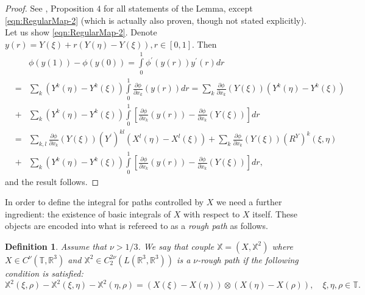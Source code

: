 \documentclass[11pt,a4paper,reqno]{amsart}%
\theoremstyle{plain}
\theoremstyle{remark}
\theoremstyle{plain}
\newtheorem{definition}[theorem]{Definition}
\numberwithin{equation}{section}
\def\Rnu{{\mathbb R}}
\def\suml{\sum\limits}
\def\intl{\int\limits}
\begin{document}
\begin{proof}%
See \cite{[Gubinelli-2004]}, Proposition $4$ for all statements of
the Lemma, except \eqref{eqn:RegularMap-2} (which is actually also
proven, though not stated explicitly). Let us show
\eqref{eqn:RegularMap-2}. Denote
$y(r)=Y(\xi)+r(Y(\eta)-Y(\xi)),r\in[0,1]$. Then
\begin{eqnarray}
\label{eqn:RegularMap-2proof}
&&
\phi(y(1))-\phi(y(0))=\intl_0^1\phi^\prime(y(r))y^\prime(r)dr
\\
\nonumber
&=&\suml_k(Y^k(\eta)-Y^k(\xi))\intl_0^1\frac{\partial\phi}{\partial
x_k}(y(r))dr
=\suml_k\frac{\partial\phi}{\partial
x_k}(Y(\xi))(Y^k(\eta)-Y^k(\xi))\nonumber
\\
&+&\suml_k(Y^k(\eta)-Y^k(\xi))\intl_0^1[\frac{\partial\phi}{\partial
x_k}(y(r))-\frac{\partial\phi}{\partial x_k}(Y(\xi))]dr\nonumber
\\
&=&\suml_{k,l}\frac{\partial\phi}{\partial
x_k}(Y(\xi))(Y^\prime)^{kl}(X^l(\eta)-X^l(\xi))
+\suml_{k}\frac{\partial\phi}{\partial
x_k}(Y(\xi))(R^Y)^k(\xi,\eta)\nonumber
\\
&+&\suml_k(Y^k(\eta)-Y^k(\xi))\intl_0^1[\frac{\partial\phi}{\partial
x_k}(y(r))-\frac{\partial\phi}{\partial
x_k}(Y(\xi))]dr,
\nonumber
\end{eqnarray}
and the result follows.
\end{proof}
In order to define the integral for paths controlled by $X$  we need a further ingredient: the existence of basic integrals of $X$ with respect to $X$ itself. These objects are encoded into what is refereed to as a \emph{rough path} as follows.
\begin{definition}\label{def:RoughPath}
Assume that  $\nu>{1}/{3}$. We say that couple
$\mathbb{X}=(X,\mathbb{X}^2)$ where $X\in C^{\nu}(\mathbb{T},\Rnu^3)$ and
$\mathbb{X}^2\in C_2^{2\nu}(L(\Rnu^3,\Rnu^3))$ is a $\nu$-rough
path if the following condition is satisfied:
\begin{equation}\label{eqn:CompatCondition}
\mathbb{X}^{2}(\xi,\rho)-\mathbb{X}^{2}(\xi,\eta)-\mathbb{X}^{2}(\eta,\rho)
=(X(\xi)-X(\eta))\otimes(X(\eta)-X(\rho)), \quad \xi,\eta,\rho\in \mathbb{T}.
\end{equation}
\end{definition}
\end{document}
